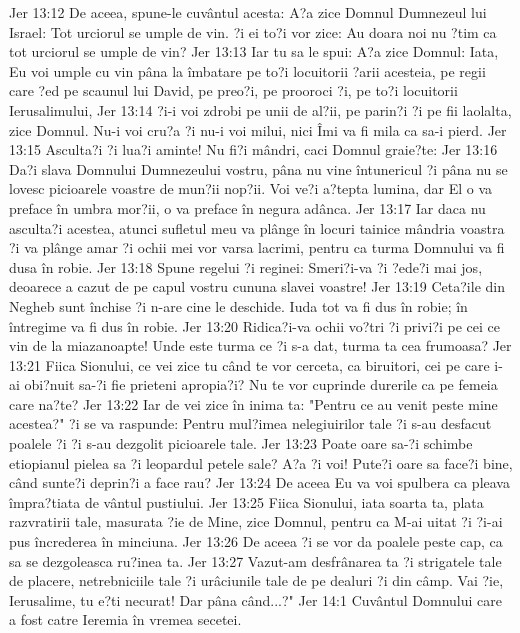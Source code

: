 Jer 13:12  De aceea, spune-le cuvântul acesta: A?a zice Domnul Dumnezeul lui Israel: Tot urciorul se umple de vin. ?i ei to?i vor zice: Au doara noi nu ?tim ca tot urciorul se umple de vin?
Jer 13:13  Iar tu sa le spui: A?a zice Domnul: Iata, Eu voi umple cu vin pâna la îmbatare pe to?i locuitorii ?arii acesteia, pe regii care ?ed pe scaunul lui David, pe preo?i, pe prooroci ?i, pe to?i locuitorii Ierusalimului,
Jer 13:14  ?i-i voi zdrobi pe unii de al?ii, pe parin?i ?i pe fii laolalta, zice Domnul. Nu-i voi cru?a ?i nu-i voi milui, nici Îmi va fi mila ca sa-i pierd.
Jer 13:15  Asculta?i ?i lua?i aminte! Nu fi?i mândri, caci Domnul graie?te:
Jer 13:16  Da?i slava Domnului Dumnezeului vostru, pâna nu vine întunericul ?i pâna nu se lovesc picioarele voastre de mun?ii nop?ii. Voi ve?i a?tepta lumina, dar El o va preface în umbra mor?ii, o va preface în negura adânca.
Jer 13:17  Iar daca nu asculta?i acestea, atunci sufletul meu va plânge în locuri tainice mândria voastra ?i va plânge amar ?i ochii mei vor varsa lacrimi, pentru ca turma Domnului va fi dusa în robie.
Jer 13:18  Spune regelui ?i reginei: Smeri?i-va ?i ?ede?i mai jos, deoarece a cazut de pe capul vostru cununa slavei voastre!
Jer 13:19  Ceta?ile din Negheb sunt închise ?i n-are cine le deschide. Iuda tot va fi dus în robie; în întregime va fi dus în robie.
Jer 13:20  Ridica?i-va ochii vo?tri ?i privi?i pe cei ce vin de la miazanoapte! Unde este turma ce ?i s-a dat, turma ta cea frumoasa?
Jer 13:21  Fiica Sionului, ce vei zice tu când te vor cerceta, ca biruitori, cei pe care i-ai obi?nuit sa-?i fie prieteni apropia?i? Nu te vor cuprinde durerile ca pe femeia care na?te?
Jer 13:22  Iar de vei zice în inima ta: "Pentru ce au venit peste mine acestea?" ?i se va raspunde: Pentru mul?imea nelegiuirilor tale ?i s-au desfacut poalele ?i ?i s-au dezgolit picioarele tale.
Jer 13:23  Poate oare sa-?i schimbe etiopianul pielea sa ?i leopardul petele sale? A?a ?i voi! Pute?i oare sa face?i bine, când sunte?i deprin?i a face rau?
Jer 13:24  De aceea Eu va voi spulbera ca pleava împra?tiata de vântul pustiului.
Jer 13:25  Fiica Sionului, iata soarta ta, plata razvratirii tale, masurata ?ie de Mine, zice Domnul, pentru ca M-ai uitat ?i ?i-ai pus încrederea în minciuna.
Jer 13:26  De aceea ?i se vor da poalele peste cap, ca sa se dezgoleasca ru?inea ta.
Jer 13:27  Vazut-am desfrânarea ta ?i strigatele tale de placere, netrebniciile tale ?i urâciunile tale de pe dealuri ?i din câmp. Vai ?ie, Ierusalime, tu e?ti necurat! Dar pâna când...?"
Jer 14:1  Cuvântul Domnului care a fost catre Ieremia în vremea secetei.
